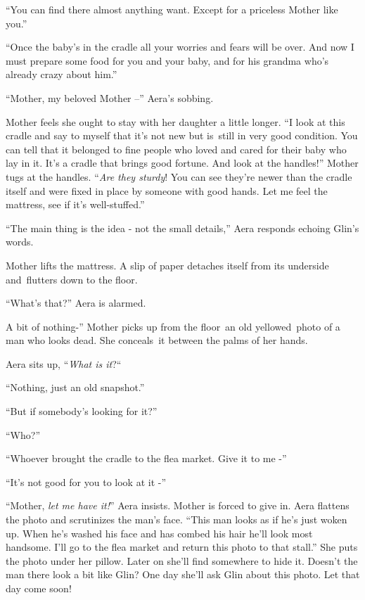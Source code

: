 \documentclass[twoside,11pt]{book}
\begin{document}
``You can find there almost anything want. Except for a priceless Mother like you.'' 

``Once the baby's in the cradle all your worries and fears will be over. And now I must prepare some food
for you and your baby, and for his grandma who's already crazy about him.'' 

``Mother, my beloved Mother --'' Aera{}'s  sobbing. ~

Mother feels she ought to stay with her daughter a little longer. ``I look at this cradle and say to myself
that it's not new but is{\ }still in very good condition. You can tell that it belonged to fine people
who loved and cared for their baby who lay in it. It's a cradle that brings good fortune. And look at the
handles!'' Mother tugs at the handles. ``\textit{Are they sturdy}! You can see they're newer
than the cradle itself and were fixed in place by someone with good hands. Let me feel the mattress, see if it's
well-stuffed.'' 

``The main thing is the idea - not the small details,'' Aera responds echoing Glin's words. 

Mother lifts the mattress. A slip of paper detaches itself from its underside and{\ }flutters down to the
floor. 

``What's that?'' Aera is alarmed. 

A bit of nothing-'' Mother picks up from the floor~an old yellowed\ photo of a man who looks dead. She
conceals{\ }it between the palms of her hands. 

Aera sits up, ``\textit{What is it}?``~ 

``Nothing, just an old snapshot.'' 

``But if somebody's looking for it?'' 

``Who?'' 

``Whoever brought the cradle to the flea market. Give it to me -'' 

``It's not good for you to look at it -'' 

``Mother, \textit{let me have it!}'' Aera insists. Mother is forced to give in. Aera flattens
the photo and scrutinizes the man's face. ``This man looks as if he's just woken up. When he's washed his
face and has combed his hair he'll look most handsome. I'll go to the flea market and return this photo to that
stall.'' She puts the photo under her pillow. Later on she'll find somewhere to hide it. Doesn't the man
there look a bit like Glin? One day she'll ask Glin about this photo.  Let that day come soon!
\end{document}
